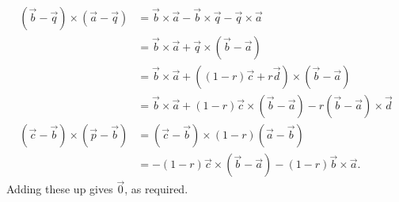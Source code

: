 \begin{enumerate}
\begin{enumerate}
\begin{align*}
(\vec{b} - \vec{q})\times (\vec{a} - \vec{q}) &= \vec{b}\times\vec{a} - \vec{b}\times\vec{q} - \vec{q}\times\vec{a} \\
&= \vec{b}\times\vec{a} + \vec{q}\times (\vec{b} - \vec{a}) \\
&= \vec{b}\times\vec{a} + ((1 - r)\vec{c} + r\vec{d})\times (\vec{b} - \vec{a}) \\
&= \vec{b}\times\vec{a} + (1 - r)\vec{c}\times (\vec{b} - \vec{a}) - r(\vec{b} - \vec{a})\times\vec{d} \\
(\vec{c} - \vec{b})\times (\vec{p} - \vec{b}) &= (\vec{c} - \vec{b})\times (1 - r)(\vec{a} - \vec{b}) \\
&= -(1 - r)\vec{c}\times (\vec{b} - \vec{a}) - (1 - r)\vec{b}\times\vec{a}.
\end{align*}
Adding these up gives $\vec{0}$, as required.
\end{enumerate}
\end{enumerate}